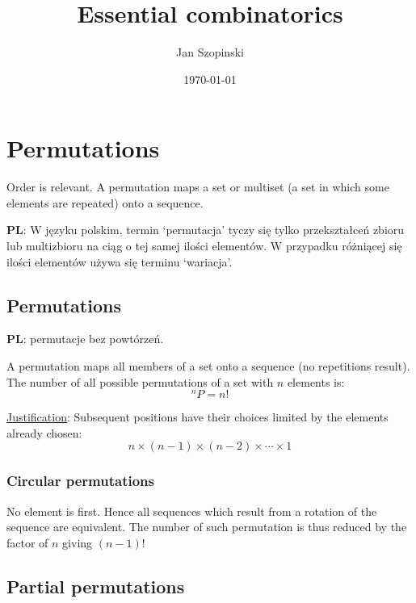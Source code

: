 \documentclass{article}
\newcommand{\pl}{\textbf{PL}: }
\begin{document}
\title{Essential combinatorics}
\author{Jan Szopinski}
\date{\frontdate\today}
\maketitle

\section{Permutations}

Order is relevant.
A permutation maps a set or multiset (a set in which some elements are repeated) onto a sequence.

\begin{otherlanguage}{polish}
    \pl
    W języku polskim, termin `permutacja' tyczy się tylko przekształceń zbioru lub multizbioru na ciąg o tej samej ilości elementów.
    W przypadku różniącej się ilości elementów używa się terminu `wariacja'.
\end{otherlanguage}

\subsection{Permutations}

\foreignlanguage{polish}{\pl permutacje bez powtórzeń.}

A permutation maps all members of a set onto a sequence (no repetitions result).
The number of all possible permutations of a set with $n$ elements is:
%
\begin{equation}
    ^nP = n!
\end{equation}

\underline{Justification}:
Subsequent positions have their choices limited by the elements already chosen:
%
\begin{equation*}
    n\times(n-1)\times(n-2)\times \dotsb \times 1
\end{equation*}

\subsubsection{Circular permutations}

No element is first.
Hence all sequences which result from a rotation of the sequence are equivalent.
The number of such permutation is thus reduced by the factor of $n$ giving ${(n-1)!}$

\subsection{Partial permutations}
\end{document}

